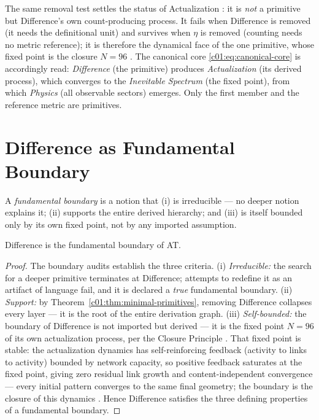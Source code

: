 The same removal test settles the status of Actualization \cite{c01:QG292,c01:MONO006}: it is
\emph{not} a primitive but Difference's own count-producing process. It fails when Difference
is removed (it needs the definitional unit) and survives when $\eta$ is removed (counting
needs no metric reference); it is therefore the dynamical face of the one primitive, whose
fixed point is the closure $N=96$ \cite{c01:QG282}. The canonical core
\eqref{c01:eq:canonical-core} is accordingly read: \emph{Difference} (the primitive) produces
\emph{Actualization} (its derived process), which converges to the \emph{Inevitable Spectrum}
(the fixed point), from which \emph{Physics} (all observable sectors) emerges. Only the first
member and the reference metric are primitives.

\section{Difference as Fundamental Boundary}
\label{c01:sec:fundamental-boundary}

\begin{definition}
\label{c01:def:boundary}
A \emph{fundamental boundary} is a notion that (i) is irreducible --- no deeper notion
explains it; (ii) supports the entire derived hierarchy; and (iii) is itself bounded only by
its own fixed point, not by any imported assumption.
\end{definition}

\begin{theorem}
\label{c01:thm:fundamental-boundary}
Difference is the fundamental boundary of AT.
\end{theorem}

\begin{proof}
The boundary audits \cite{c01:QG278,c01:QG279} establish the three criteria. (i) \emph{Irreducible:}
the search for a deeper primitive terminates at Difference; attempts to redefine it as an
artifact of language fail, and it is declared a \emph{true} fundamental boundary. (ii)
\emph{Support:} by Theorem~\ref{c01:thm:minimal-primitives}, removing Difference collapses every
layer --- it is the root of the entire derivation graph. (iii) \emph{Self-bounded:} the
boundary of Difference is not imported but derived --- it is the fixed point $N=96$ of its own
actualization process, per the Closure Principle \cite{c01:QG282}. That fixed point is stable:
the actualization dynamics has self-reinforcing feedback (activity to links to activity)
bounded by network capacity, so positive feedback saturates at the fixed point, giving zero
residual link growth and content-independent convergence --- every initial pattern converges
to the same final geometry; the boundary is the closure of this dynamics \cite{c01:QG282}.
Hence Difference satisfies the three defining properties of a fundamental boundary.
\end{proof}

